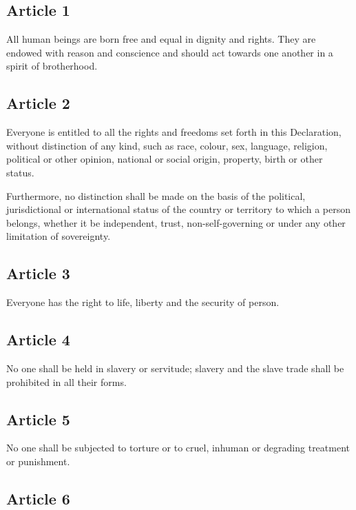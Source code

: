 \documentclass[
  ngerman,
  american,
  titlepage,
  openright,
  DIV=calc,
  toc=listof,
  listof=nochaptergap]{scrbook}
\begin{document}
\subsection{Article 1}\label{article-1-2}

All human beings are born free and equal in dignity and rights. They are
endowed with reason and conscience and should act towards one another in
a spirit of brotherhood.

\subsection{Article 2}\label{article-2-2}

Everyone is entitled to all the rights and freedoms set forth in this
Declaration, without distinction of any kind, such as race, colour, sex,
language, religion, political or other opinion, national or social
origin, property, birth or other status.

Furthermore, no distinction shall be made on the basis of the political,
jurisdictional or international status of the country or territory to
which a person belongs, whether it be independent, trust,
non-self-governing or under any other limitation of sovereignty.

\subsection{Article 3}\label{article-3-2}

Everyone has the right to life, liberty and the security of person.

\subsection{Article 4}\label{article-4-2}

No one shall be held in slavery or servitude; slavery and the slave
trade shall be prohibited in all their forms.

\subsection{Article 5}\label{article-5-2}

No one shall be subjected to torture or to cruel, inhuman or degrading
treatment or punishment.

\subsection{Article 6}\label{article-6-2}
\end{document}
